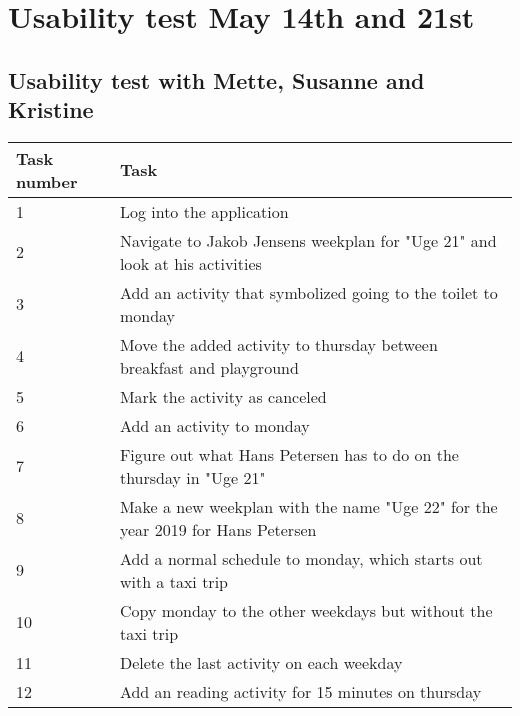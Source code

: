 \newpage
\chapter{Usability test May 14th and 21st}\label{usability-test-14-05}
\section{Usability test with Mette, Susanne and Kristine}\label{usability-test-14-05-mette}
\begin{table}[H]
    \small
    \begin{tabular}{|p{1.3cm}|p{12cm}|}
    \hline
    Task number  &Task                                                                            \\ \hline
    1 & Log into the application                                                                           \\ \hline
    2 & Navigate to Jakob Jensens weekplan for "Uge 21" and look at his activities                   \\ \hline
    3 & Add an activity that symbolized going to the toilet to monday                                           \\ \hline
    4 & Move the added activity to thursday between breakfast and playground                         \\ \hline
    5 & Mark the activity as canceled                                                                 \\ \hline
    6 & Add an activity to monday                                                                      \\ \hline
    7 & Figure out what Hans Petersen has to do on the thursday in "Uge 21"                              \\ \hline
    8 & Make a new weekplan with the name "Uge 22" for the year 2019 for Hans Petersen                              \\ \hline
    9 & Add a normal schedule to monday, which starts out with a taxi trip                          \\ \hline
    10 & Copy monday to the other weekdays but without the taxi trip                                        \\ \hline
    11 & Delete the last activity on each weekday                                                        \\ \hline
    12 & Add an reading activity for 15 minutes on thursday                                              \\ \hline

\end{tabular}
\end{table}
